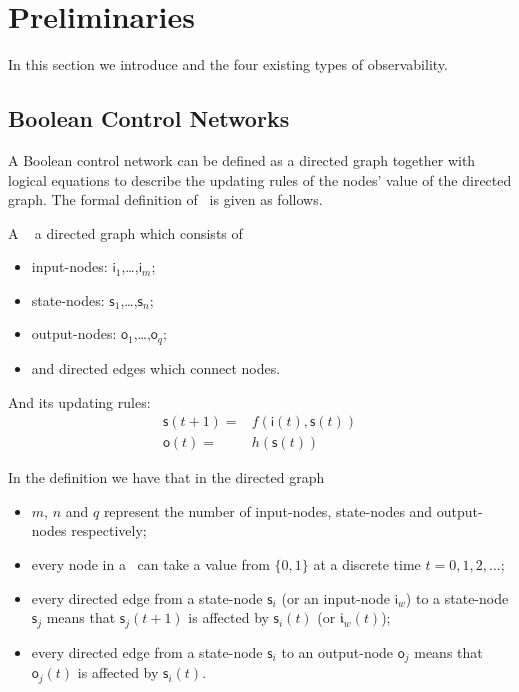\section{Preliminaries} 
\label{sec:pre}
In this section we introduce {\BCNs} and the four existing types of observability. 

\subsection{Boolean Control Networks}

A Boolean control network can be defined as a directed graph together with logical equations to describe the updating rules of the nodes' value of the directed graph. The formal definition of \BCN\ is given as follows. 
\begin{definition} A \BCN\ %
	a directed graph which consists of 
	\begin{itemize}
	\item input-nodes: {$\mathsf{i}_1$,\ldots ,$\mathsf{i}_m$};
	\item state-nodes: {$\mathsf{s}_1$,\ldots ,$\mathsf{s}_n$};
	\item output-nodes: {$\mathsf{o}_1$,\ldots ,$\mathsf{o}_q$};
	\item and directed edges which connect nodes. 
\end{itemize}
	
And its updating rules:
\begin{equation}
\begin{split}
\mathsf{s}(t+1)=&f(\mathsf{i}(t),\mathsf{s}(t))\\
\mathsf{o}(t)=&h(\mathsf{s}(t))
\end{split}
\label{equ:1}
\end{equation}

 \end{definition}
In the definition we have that in the directed graph
\begin{itemize}
	\item $m$, $n$ and $q$ represent the number of input-nodes, state-nodes and output-nodes respectively;
          \item every node in a \BCN\ can take a value from $\{0,1\}$ at a discrete time $t=0, 1, 2,\ldots$;
	\item every directed edge from a state-node $\mathsf{s}_i$ (or an input-node $\mathsf{i}_w$) to a state-node $\mathsf{s}_j$ means that  $\mathsf{s}_j(t+1)$ is affected by $\mathsf{s}_i(t)$ (or $\mathfrak{i}_w(t)$);	
	\item every directed edge from a state-node $\mathsf{s}_i$ to an output-node $\mathsf{o}_j$ means that   $\mathsf{o}_j(t)$  is affected by $\mathsf{s}_i(t)$.  
	\end{itemize}
